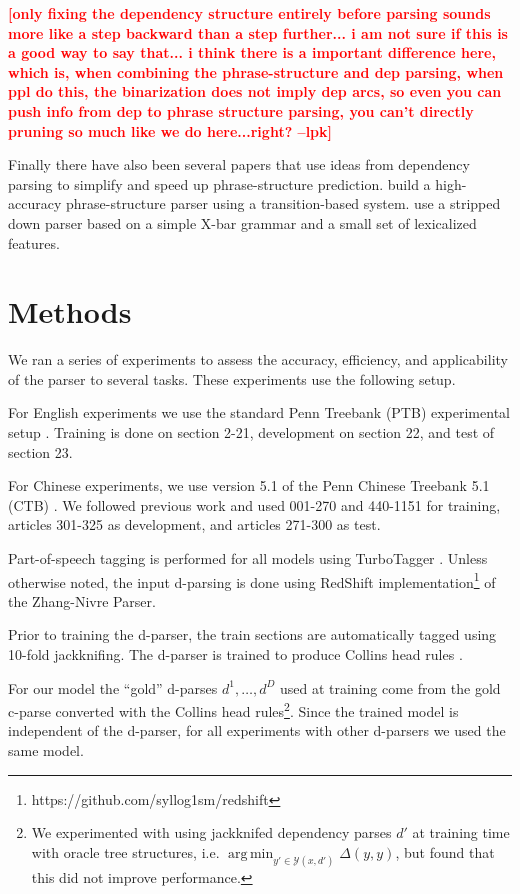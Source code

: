 \documentclass[11pt,letterpaper]{article}
\DeclareMathOperator*{\argmin}{arg\,min}
\newcommand{\lpkcomment}[1]{\textcolor{red}{\bf \small [#1 --lpk]}}
\begin{document}

\lpkcomment{only fixing the dependency structure
entirely before parsing sounds more like a step backward than a step further... i am not sure if this is a good way to say that... i think there is a important difference here, which is, when combining the phrase-structure and dep parsing, when ppl do this, the binarization does not imply dep arcs, so even you can push info from dep to phrase structure parsing, you can't directly pruning so much like we do here...right?}


Finally there have also been several papers that use ideas from
dependency parsing to simplify and speed up phrase-structure prediction.
 build a high-accuracy phrase-structure parser
using a transition-based system.  use a stripped
down parser based on a simple X-bar grammar and a small set of lexicalized features.



\section{Methods}

We ran a series of experiments to assess the accuracy, efficiency,
and applicability of the parser to several tasks. These experiments
use the following setup.  

For English experiments we use the standard Penn Treebank (PTB)
experimental setup \cite{marcus1993building}. Training is done on
section 2-21, development on section 22, and test of section 23.

For Chinese experiments, we use version 5.1 of the Penn  Chinese Treebank 5.1 (CTB) \cite{xue2005penn}. We followed previous work and used
001-270 and 440-1151 for training, articles
301-325 as development, and articles
271-300 as test.

Part-of-speech tagging is performed for all models  using TurboTagger
\cite{martins2013turning}. Unless otherwise noted, the input d-parsing
is done using RedShift
implementation\footnote{https://github.com/syllog1sm/redshift} of the
Zhang-Nivre Parser\cite{zhang2011transition}.

  
Prior to training the d-parser, the train sections are
automatically tagged using 10-fold jackknifing. The 
d-parser is trained to produce Collins head rules 
\cite{collins2003head}.

For our model the ``gold'' d-parses $d^1, \ldots, d^D$   
used at training come from the gold c-parse converted with 
the Collins head rules\footnote{ We experimented with using
  jackknifed dependency parses $d'$ at training time with oracle tree
  structures, i.e. $\argmin_{y' \in \mathcal{Y}(x, d')} \Delta(y, y)$,
  but found that this did not improve performance.}. Since the trained
model is independent of the d-parser,  
for all experiments with other d-parsers we used the same model.
\end{document}
